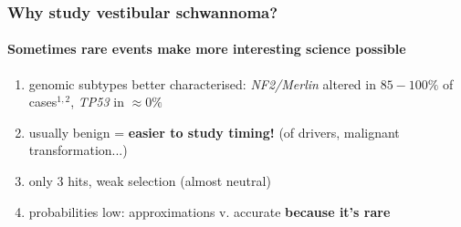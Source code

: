 \documentclass{beamer}
\begin{document}

\begin{frame}
    \frametitle{Why study vestibular schwannoma?}
    \framesubtitle{Sometimes rare events make more interesting science possible}

    \begin{enumerate}
        \item genomic subtypes better characterised: \emph{NF2/Merlin}
        altered in $85-100\%$ of cases${}^{1,2}$, \emph{TP53} in
        $\approx 0\%$
        \item usually benign = \textbf{easier to study timing!} (of drivers,
        malignant transformation...)
        \item only 3 hits, weak selection (almost neutral)
        \item probabilities low: approximations v. accurate \textbf{because it's rare}
    \end{enumerate}

    \newblock 
    \newblock 
\end{frame}
\end{document}
